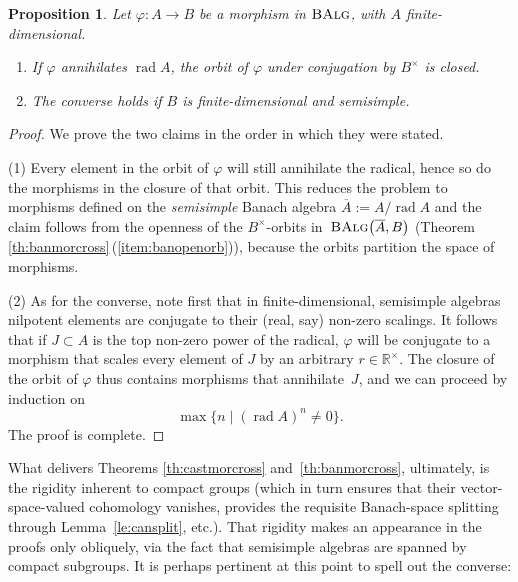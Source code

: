 \documentclass[pdftex]{sigma}
\numberwithin{equation}{section}
\newtheorem{Proposition}[Theorem]{Proposition}
 { \theoremstyle{definition}
\newtheorem{Definition}[Theorem]{Definition}
\newtheorem{Note}[Theorem]{Note}
\newtheorem{Notation}[Theorem]{Notation}
\newtheorem{Example}[Theorem]{Example}
\newtheorem{Examples}[Theorem]{Examples}
\newtheorem{Remark}[Theorem]{Remark}
\newtheorem{Remarks}[Theorem]{Remarks}
\newtheorem{Convention}[Theorem]{Convention}
}
\newcommand\bR{{\mathbb R}}
\newcommand{\cat}[1]{\text{\sc #1}}
\begin{document}
\begin{Proposition}\label{pr:clorb}
 Let $\varphi\colon A\to B$ be a morphism in $\cat{BAlg}$, with $A$ finite-dimensional.
 \begin{enumerate}[$(1)$]\itemsep=0pt
 \item If $\varphi$ annihilates $\operatorname{rad}A$, the orbit of $\varphi$ under conjugation by $B^{\times}$ is closed.
 \item The converse holds if $B$ is finite-dimensional and semisimple.
 \end{enumerate}
\end{Proposition}
\begin{proof}
 We prove the two claims in the order in which they were stated.

(1) Every element in the orbit of $\varphi$ will still annihilate the radical, hence so do the morphisms in the closure of that orbit. This reduces the problem to morphisms defined on the {\it semisimple} Banach algebra $\overline{A}:=A/\operatorname{rad}A$ and the claim follows from the openness of the $B^{\times}$-orbits in~$\cat{BAlg}\big(\overline{A},B\big)$ (Theorem \ref{th:banmorcross}\,(\ref{item:banopenorb})), because the orbits partition the space of morphisms.

(2) As for the converse, note first that in finite-dimensional, semisimple algebras nilpotent elements are conjugate to their (real, say) non-zero scalings. It follows that if $J\subset A$ is the top non-zero power of the radical, $\varphi$ will be conjugate to a morphism that scales every element of $J$ by an arbitrary $r\in \bR^{\times}$. The closure of the orbit of $\varphi$ thus contains morphisms that annihilate~$J$, and we can proceed by induction on
 \begin{equation*}
 \max\{n\mid(\operatorname{rad}A)^n\ne 0\}.
 \end{equation*}
 The proof is complete.
\end{proof}

What delivers Theorems \ref{th:castmorcross} and~\ref{th:banmorcross}, ultimately, is the rigidity inherent to compact groups (which in turn ensures that their vector-space-valued cohomology vanishes, provides the requisite Banach-space splitting through Lemma~\ref{le:cansplit}, etc.). That rigidity makes an appearance in the proofs only obliquely, via the fact that semisimple algebras are spanned by compact subgroups. It is perhaps pertinent at this point to spell out the converse:
\end{document}
